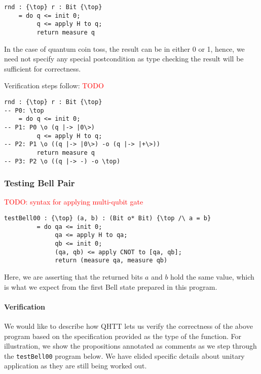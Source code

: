 \documentclass[acmsmall,nonacm,timestamp,review=false,anonymous=false]{acmart}
\newcommand{\todo}[1]{\textcolor{red}{#1}}
\begin{document}
\begin{minipage}{0.95\linewidth}
\begin{lstlisting}[language=QHaskell]
rnd : {\top} r : Bit {\top}
    = do q <= init 0;
         q <= apply H to q;
         return measure q
\end{lstlisting}
\end{minipage}

In the case of quantum coin toss, the result can be in either 0 or 1, hence, we need not specify any special postcondition as type checking the result will be sufficient for correctness.

Verification steps follow: \todo{TODO}

\begin{minipage}{0.95\linewidth}
\begin{lstlisting}[language=QHaskell]
rnd : {\top} r : Bit {\top}
-- P0: \top
    = do q <= init 0;
-- P1: P0 \o (q |-> |0\>)
         q <= apply H to q;
-- P2: P1 \o ((q |-> |0\>) -o (q |-> |+\>))
         return measure q
-- P3: P2 \o ((q |-> -) -o \top)
\end{lstlisting}
\end{minipage}

\subsubsection{Testing Bell Pair}
\leavevmode
\todo{TODO: syntax for applying multi-qubit gate}

\begin{minipage}{0.95\linewidth}
\begin{lstlisting}[language=QHaskell]
testBell00 : {\top} (a, b) : (Bit o* Bit) {\top /\ a = b}
         = do qa <= init 0;
              qa <= apply H to qa;
              qb <= init 0;
              (qa, qb) <= apply CNOT to [qa, qb];
              return (measure qa, measure qb)
\end{lstlisting}
\end{minipage}

Here, we are asserting that the returned bits $a$ and $b$ hold the same value, which is what we expect from the first Bell state prepared in this program.

\paragraph{Verification}
We would like to describe how QHTT lets us verify the correctness of the above program based on the specification provided as the type of the function. For illustration, we show the propositions annotated as comments as we step through the \texttt{testBell00} program below. We have elided specific details about unitary application as they are still being worked out.
\end{document}
